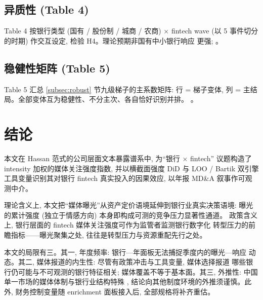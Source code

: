 \subsection{异质性 (Table 4)}
Table 4 按银行类型 (国有 / 股份制 / 城商 / 农商) $\times$ fintech wave
(以 5 事件切分的时期) 作交互设定, 检验 H4。理论预期非国有中小银行响应
更强; 。

\subsection{稳健性矩阵 (Table 5)}
Table 5 汇总 \ref{subsec:robust} 节九级梯子的主系数矩阵: 行 = 梯子变体,
列 = 主结局。全部变体互为稳健性、不分主次、各自恰好识别并排。
。

\section{结论}\label{sec:conclusion}

本文在 Hassan 范式的公司层面文本暴露谱系中, 为``银行 $\times$ fintech''
议题构造了 intensity 加权的媒体关注强度指数, 并以横截面强度 DiD 与
LOO / Bartik 双引擎工具变量识别其对银行 fintech 真实投入的因果效应,
以年报 MD\&A 叙事作可观测中介。

理论含义上, 本文把``媒体曝光''从资产定价语境延伸到银行业真实决策语境:
曝光的累计强度 (独立于情感方向) 本身即构成可测的竞争压力显著性通道。
政策含义上, 银行层面的 fintech 媒体关注强度可作为监管者监测银行数字化
转型压力的前瞻指标——曝光聚集之处, 往往是转型压力与资源重配先行之处。

本文的局限有三。其一, 年度频率: 银行—年面板无法捕捉季度内的曝光—响应
动态。其二, 媒体报道的内生性: 尽管有政策冲击与工具变量, 媒体选择报道
哪些银行仍可能与不可观测的银行特征相关; 媒体覆盖不等于基本面。其三,
外推性: 中国单一市场的媒体体制与银行业结构特殊
\parencite{qin2018mediabias}, 结论向其他制度环境的外推须谨慎。此外,
财务控制变量随 enrichment 面板接入后, 全部规格将补齐重估。

\printbibliography


